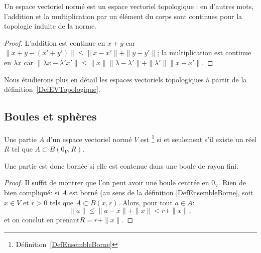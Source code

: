 \begin{proposition}
Un espace vectoriel normé est un espace vectoriel topologique : en d'autres mots, l'addition et la multiplication par un élément du corps sont continues pour la topologie induite de la norme.
\end{proposition}

\begin{proof}
  L'addition est continue en \( x + y \) car \( \| x + y - (x' + y') \| \leq \|x - x' \| + \| y - y' \|  \); la multiplication est continue en \( \lambda x \) car  \( \| \lambda x - \lambda' x' \| \leq \| x \| \| \lambda - \lambda' \| + \| \lambda' \| \| x - x' \| \).
\end{proof}

Nous étudierons plus en détail les espaces vectoriels topologiques à partir de la définition~\ref{DefEVTopologique}.

\subsection{Boules et sphères}

\begin{proposition}\label{PropEnsembleBorneEVN}
	Une partie $A$ d'un espace vectoriel normé $V$ est \footnote{Définition~\ref{DefEnsembleBorne}} si et seulement s'il existe un réel $R$ tel que $A\subset B(0_V,R)$.
\end{proposition}
Une partie est donc bornée si elle est contenue dans une boule de rayon fini.
\begin{proof}
  Il suffit de montrer que l'on peut avoir une boule centrée en \( 0_V \). Rien de bien compliqué: si \(A \) est borné (au sens de la définition \ref{DefEnsembleBorne}, soit \( x \in V\) et \( r > 0 \) tels que \( A \subset B(x, r) \). Alors, pour tout \(a \in A\):
  \begin{equation}
    \| a \| \leq \| a - x \| + \| x \| < r + \|x \|,
  \end{equation}
et on conclut en prenant\( R = r + \| x \| \).
\end{proof}



